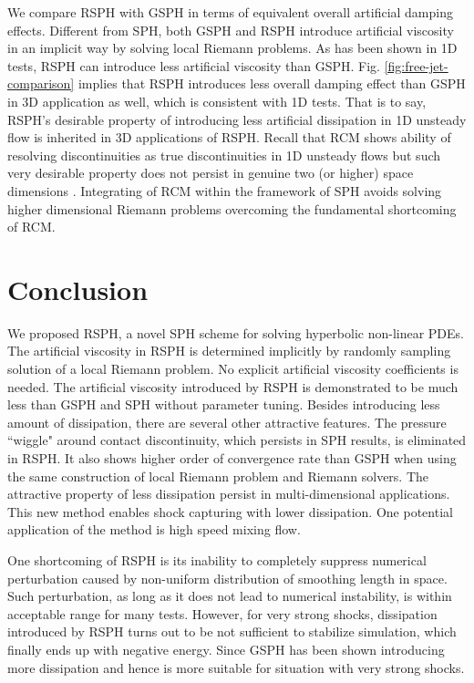 We compare RSPH with GSPH in terms of equivalent overall artificial damping effects. Different from SPH, both GSPH and RSPH introduce artificial viscosity in an implicit way by solving local Riemann problems. As has been shown in 1D tests, RSPH can introduce less artificial viscosity than GSPH. Fig. \ref{fig:free-jet-comparison} implies that RSPH introduces less overall damping effect than GSPH in 3D application as well, which is consistent with 1D tests. That is to say, RSPH's desirable property of introducing less artificial dissipation in 1D unsteady flow is inherited in 3D applications of RSPH. Recall that RCM shows ability of resolving discontinuities as true discontinuities in 1D unsteady flows but such very desirable property does not persist in genuine two (or higher) space dimensions \citep{colella1982glimm}. Integrating of RCM within the framework of SPH avoids solving higher dimensional Riemann problems overcoming the fundamental shortcoming of RCM.

\section{Conclusion}
We proposed RSPH, a novel SPH scheme for solving hyperbolic non-linear PDEs. The artificial viscosity in RSPH is determined implicitly by randomly sampling solution of a local Riemann problem. No explicit artificial viscosity coefficients is needed. The artificial viscosity introduced by RSPH is demonstrated to be much less than GSPH and SPH without parameter tuning. Besides introducing less amount of dissipation, there are several other attractive features. The pressure ``wiggle" around contact discontinuity, which persists in SPH results, is eliminated in RSPH. It also shows higher order of convergence rate than GSPH when using the same construction of local Riemann problem and Riemann solvers. The attractive property of less dissipation persist in multi-dimensional applications.
This new method enables shock capturing with lower dissipation. One potential application of the method is high speed mixing flow.

One shortcoming of RSPH is its inability to completely suppress numerical perturbation caused by non-uniform distribution of smoothing length in space. Such perturbation, as long as it does not lead to numerical instability, is within acceptable range for many tests. However, for very strong shocks, dissipation introduced by RSPH turns out to be not sufficient to stabilize simulation, which finally ends up with negative energy. Since GSPH has been shown introducing more dissipation and hence is more suitable for situation with very strong shocks.

